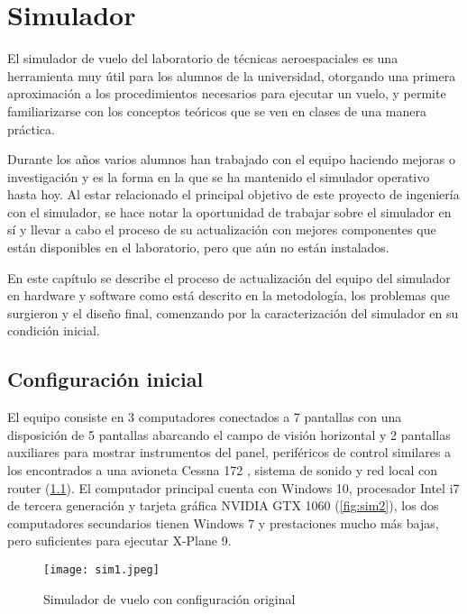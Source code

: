 \chapter{Simulador}

El simulador de vuelo del laboratorio de técnicas aeroespaciales es una herramienta muy útil para los alumnos de la universidad, otorgando una primera aproximación a los procedimientos necesarios para ejecutar un vuelo, y permite familiarizarse con los conceptos teóricos que se ven en clases de una manera práctica.

Durante los años varios alumnos han trabajado con el equipo haciendo mejoras o investigación y es la forma en la que se ha mantenido el simulador operativo hasta hoy. Al estar relacionado el principal objetivo de este proyecto de ingeniería con el simulador, se hace notar la oportunidad de trabajar sobre el simulador en sí y llevar a cabo el proceso de su actualización con mejores componentes que están disponibles en el laboratorio, pero que aún no están instalados.

En este capítulo se describe el proceso de actualización del equipo del simulador en hardware y software como está descrito en la metodología, los problemas que surgieron y el diseño final, comenzando por la caracterización del simulador en su condición inicial.

\section{Configuración inicial}

El equipo consiste en 3 computadores conectados a 7 pantallas con una disposición de 5 pantallas abarcando el campo de visión horizontal y 2 pantallas auxiliares para mostrar instrumentos del panel, periféricos de control similares a los encontrados a una avioneta Cessna 172 \cite{saitek}, sistema de sonido y red local con router (\ref{fig:sim1}). El computador principal cuenta con Windows 10, procesador Intel i7 de tercera generación y tarjeta gráfica NVIDIA GTX 1060 (\ref{fig:sim2}), los dos computadores secundarios tienen Windows 7 y prestaciones mucho más bajas, pero suficientes para ejecutar X-Plane 9.

\begin{figure}[h]
	\centering
	\texttt{[image: sim1.jpeg]}
	\caption{Simulador de vuelo con configuración original}
	\label{fig:sim1}
\end{figure}

